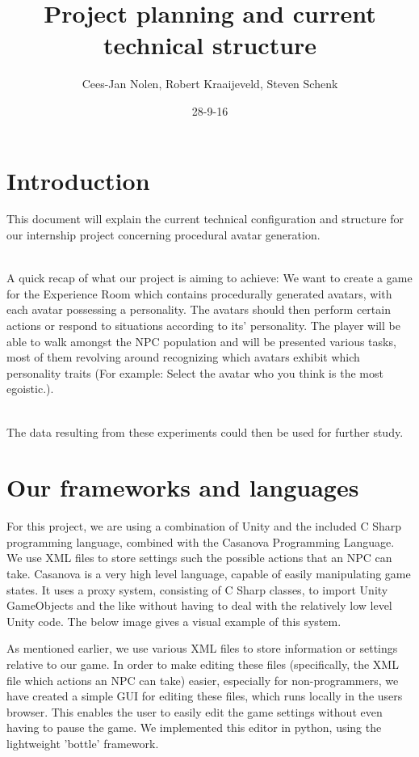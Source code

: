 \documentclass[11pt]{article} %
\title{Project planning and current technical structure}
\author{Cees-Jan Nolen, Robert Kraaijeveld, Steven Schenk}
\date{28-9-16}
\begin{document}
  \maketitle
  \newpage
  \tableofcontents

\newpage
\section{Introduction}
This document will explain the current technical configuration and structure for our internship project concerning procedural avatar generation. 

~\\
A quick recap of what our project is aiming to achieve: We want to create a game for the Experience Room which contains procedurally generated avatars, with each avatar possessing a personality. The avatars should then perform certain actions or respond to situations according to its' personality. The player will be able to walk amongst the NPC population and will be presented various tasks, most of them revolving around recognizing which avatars exhibit which personality traits (For example: Select the avatar who you think is the most egoistic.).

~\\
The data resulting from these experiments could then be used for further study.


\newpage
\section{Our frameworks and languages}
For this project, we are using a combination of Unity and the included C Sharp programming language, combined with the Casanova Programming Language. We use XML files to store settings such the possible actions that an NPC can take.
Casanova is a very high level language, capable of easily manipulating game states. It uses a proxy system, consisting of C Sharp classes, to import Unity GameObjects and the like without having to deal with the relatively low level Unity code. The below image gives a visual example of this system.


As mentioned earlier, we use various XML files to store information or settings relative to our game. In order to make editing these files (specifically, the XML file which actions an NPC can take) easier, especially for non-programmers, we have created a simple GUI for editing these files, which runs locally in the users browser. This enables the user to easily edit the game settings without even having to pause the game. We implemented this editor in python, using the lightweight 'bottle' framework.
\end{document}
